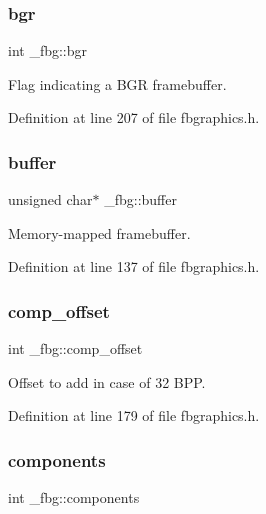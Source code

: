 \mbox{\label{struct__fbg_a5844c5bf4789117cbc0c972ff160b338}} 
\subsubsection{\texorpdfstring{bgr}{bgr}}
{\footnotesize\ttfamily int \+\_\+fbg\+::bgr}



Flag indicating a B\+GR framebuffer. 



Definition at line 207 of file fbgraphics.\+h.

\mbox{\label{struct__fbg_abd19f36337c99f866e03eb88f6c2a9d5}} 
\subsubsection{\texorpdfstring{buffer}{buffer}}
{\footnotesize\ttfamily unsigned char$\ast$ \+\_\+fbg\+::buffer}



Memory-\/mapped framebuffer. 



Definition at line 137 of file fbgraphics.\+h.

\mbox{\label{struct__fbg_a7c2e64d2f40575c8a989c759c30acb0e}} 
\subsubsection{\texorpdfstring{comp\+\_\+offset}{comp\_offset}}
{\footnotesize\ttfamily int \+\_\+fbg\+::comp\+\_\+offset}



Offset to add in case of 32 B\+PP. 



Definition at line 179 of file fbgraphics.\+h.

\mbox{\label{struct__fbg_a1db77a2ef506723a575644dbc1cfb747}} 
\subsubsection{\texorpdfstring{components}{components}}
{\footnotesize\ttfamily int \+\_\+fbg\+::components}



